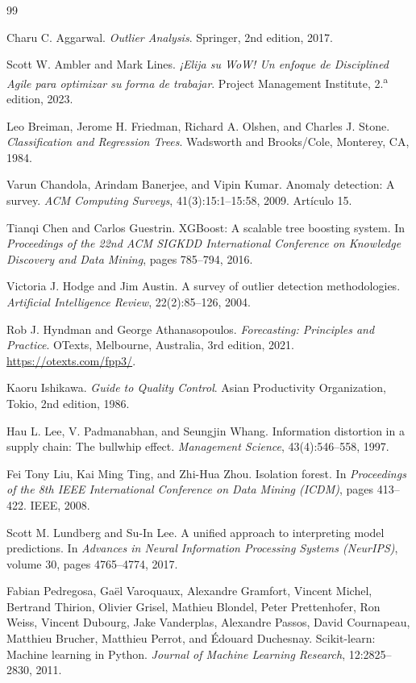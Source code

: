 \begin{thebibliography}{99}

 Charu C. Aggarwal. \emph{Outlier Analysis}. Springer, 2nd edition, 2017.

 Scott W. Ambler and Mark Lines. \emph{¡Elija su WoW! Un enfoque de Disciplined Agile para optimizar su forma de trabajar}. Project Management Institute, 2.\textsuperscript{a} edition, 2023.

 Leo Breiman, Jerome H. Friedman, Richard A. Olshen, and Charles J. Stone. \emph{Classification and Regression Trees}. Wadsworth and Brooks/Cole, Monterey, CA, 1984.

 Varun Chandola, Arindam Banerjee, and Vipin Kumar. Anomaly detection: A survey. \emph{ACM Computing Surveys}, 41(3):15:1--15:58, 2009. Artículo 15.

 Tianqi Chen and Carlos Guestrin. XGBoost: A scalable tree boosting system. In \emph{Proceedings of the 22nd ACM SIGKDD International Conference on Knowledge Discovery and Data Mining}, pages 785--794, 2016.

 Victoria J. Hodge and Jim Austin. A survey of outlier detection methodologies. \emph{Artificial Intelligence Review}, 22(2):85--126, 2004.

 Rob J. Hyndman and George Athanasopoulos. \emph{Forecasting: Principles and Practice}. OTexts, Melbourne, Australia, 3rd edition, 2021. \url{https://otexts.com/fpp3/}.

 Kaoru Ishikawa. \emph{Guide to Quality Control}. Asian Productivity Organization, Tokio, 2nd edition, 1986.

 Hau L. Lee, V. Padmanabhan, and Seungjin Whang. Information distortion in a supply chain: The bullwhip effect. \emph{Management Science}, 43(4):546--558, 1997.

 Fei Tony Liu, Kai Ming Ting, and Zhi-Hua Zhou. Isolation forest. In \emph{Proceedings of the 8th IEEE International Conference on Data Mining (ICDM)}, pages 413--422. IEEE, 2008.

 Scott M. Lundberg and Su-In Lee. A unified approach to interpreting model predictions. In \emph{Advances in Neural Information Processing Systems (NeurIPS)}, volume 30, pages 4765--4774, 2017.

 Fabian Pedregosa, Gaël Varoquaux, Alexandre Gramfort, Vincent Michel, Bertrand Thirion, Olivier Grisel, Mathieu Blondel, Peter Prettenhofer, Ron Weiss, Vincent Dubourg, Jake Vanderplas, Alexandre Passos, David Cournapeau, Matthieu Brucher, Matthieu Perrot, and Édouard Duchesnay. Scikit-learn: Machine learning in Python. \emph{Journal of Machine Learning Research}, 12:2825--2830, 2011.


\end{thebibliography}
